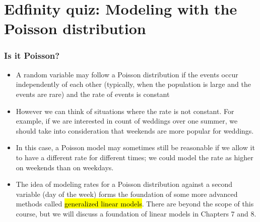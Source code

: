 \documentclass[slidestop,compress,mathserif]{beamer}
\begin{document}

\section{Edfinity quiz: Modeling with the Poisson distribution}


\begin{frame}
\frametitle{Is it Poisson?}
\begin{small}
\begin{itemize}

\item A random variable may follow a Poisson distribution if the events occur independently of each other (typically, when the population is large and the events are rare) and the rate of events is constant

\item However we can think of situations where the rate is not constant. For example, if we are interested in count of weddings over one summer, we should take into consideration that weekends are more popular for weddings.

\item In this case, a Poisson model may sometimes still be reasonable if we allow it to have a different rate for different times; we could model the rate as higher on weekends than on weekdays.

\item The idea of modeling rates for a Poisson distribution against a second variable (day of the week) forms the
foundation of some more advanced methods called \hl{generalized linear models}. There are beyond the scope of this course, but we will discuss a foundation of linear models in Chapters 7 and 8.

\end{itemize}
\end{small}

\end{frame}

\end{document}
